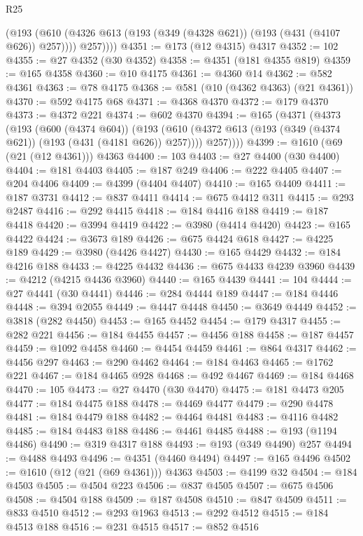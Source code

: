 \begin{lexlean}{R25}
\begin{coremodule}
          (@193
            (@610 (@4326 @613 (@193 (@349 (@4328 @621)) (@193 (@431 (@4107 @626)) @257))))
            @257))))
@4351 := @173 (@12 @4315) @4317
@4352 := 102
@4355 := @27 @4352 (@30 @4352)
@4358 := @4351 (@181 @4355 @819)
@4359 := @165 @4358
@4360 := @10 @4175
@4361 := @4360 @14
@4362 := @582 @4361
@4363 := @78 @4175
@4368 := @581 (@10 (@4362 @4363) (@21 @4361))
@4370 := @592 @4175 @68
@4371 := @4368 @4370
@4372 := @179 @4370
@4373 := @4372 @221
@4374 := @602 @4370
@4394 := @165
    (@4371
      (@4373
        (@193
          (@600 (@4374 @604))
          (@193
            (@610 (@4372 @613 (@193 (@349 (@4374 @621)) (@193 (@431 (@4181 @626)) @257))))
            @257))))
@4399 := @1610 (@69 (@21 (@12 @4361))) @4363
@4400 := 103
@4403 := @27 @4400 (@30 @4400)
@4404 := @181 @4403
@4405 := @187 @249
@4406 := @222 @4405
@4407 := @204 @4406
@4409 := @4399 (@4404 @4407)
@4410 := @165 @4409
@4411 := @187 @3731
@4412 := @837 @4411
@4414 := @675 @4412 @311
@4415 := @293 @2487
@4416 := @292 @4415
@4418 := @184 @4416 @188
@4419 := @187 @4418
@4420 := @3994 @4419
@4422 := @3980 (@4414 @4420)
@4423 := @165 @4422
@4424 := @3673 @189
@4426 := @675 @4424 @618
@4427 := @4225 @189
@4429 := @3980 (@4426 @4427)
@4430 := @165 @4429
@4432 := @184 @4216 @188
@4433 := @4225 @4432
@4436 := @675 @4433 @4239 @3960
@4439 := @4212 (@4215 @4436 @3960)
@4440 := @165 @4439
@4441 := 104
@4444 := @27 @4441 (@30 @4441)
@4446 := @284 @4444 @189
@4447 := @184 @4446
@4448 := @394 @2055
@4449 := @4447 @4448
@4450 := @3649 @4449
@4452 := @3818 (@282 @4450)
@4453 := @165 @4452
@4454 := @179 @4317
@4455 := @282 @221
@4456 := @184 @4455
@4457 := @4456 @188
@4458 := @187 @4457
@4459 := @1092 @4458
@4460 := @4454 @4459
@4461 := @864 @4317
@4462 := @4456 @297
@4463 := @290 @4462
@4464 := @184 @4463
@4465 := @1762 @221
@4467 := @184 @4465 @928
@4468 := @492 @4467
@4469 := @184 @4468
@4470 := 105
@4473 := @27 @4470 (@30 @4470)
@4475 := @181 @4473 @205
@4477 := @184 @4475 @188
@4478 := @4469 @4477
@4479 := @290 @4478
@4481 := @184 @4479 @188
@4482 := @4464 @4481
@4483 := @4116 @4482
@4485 := @184 @4483 @188
@4486 := @4461 @4485
@4488 := @193 (@1194 @4486)
@4490 := @319 @4317 @188
@4493 := @193 (@349 @4490) @257
@4494 := @4488 @4493
@4496 := @4351 (@4460 @4494)
@4497 := @165 @4496
@4502 := @1610 (@12 (@21 (@69 @4361))) @4363
@4503 := @4199 @32
@4504 := @184 @4503
@4505 := @4504 @223
@4506 := @837 @4505
@4507 := @675 @4506
@4508 := @4504 @188
@4509 := @187 @4508
@4510 := @847 @4509
@4511 := @833 @4510
@4512 := @293 @1963
@4513 := @292 @4512
@4515 := @184 @4513 @188
@4516 := @231 @4515
@4517 := @852 @4516

\end{coremodule}
\end{lexlean}
